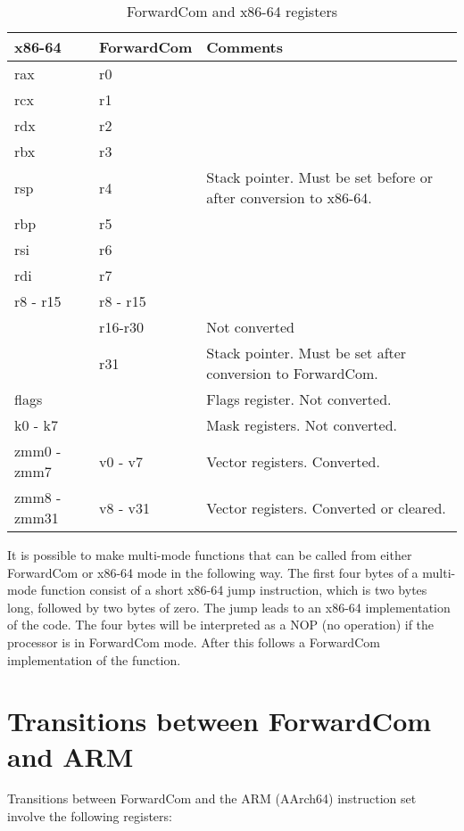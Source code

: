 \documentclass[forwardcom.tex]{subfiles}
\begin{document}
\begin{longtable} {|p{20mm}|p{20mm}|p{80mm}|}
\caption{ForwardCom and x86-64 registers} 
\label{table:ForwardComAndX64Registers}
\\
\endfirsthead
\endhead
\hline
\bfseries x86-64 & \bfseries ForwardCom & \bfseries Comments  \\
\hline
rax & r0 &   \\ 
rcx & r1 &  \\ 
rdx & r2 &  \\ 
rbx & r3 &  \\ 
rsp & r4 & Stack pointer. Must be set before or after conversion to x86-64. \\
rbp & r5 &  \\ 
rsi & r6 &  \\ 
rdi & r7 &  \\ 
r8 - r15 & r8 - r15 &  \\
\hline
 & r16-r30  & Not converted \\
 & r31 & Stack pointer. Must be set after conversion to ForwardCom. \\
\hline
flags &  & Flags register. Not converted. \\
\hline
k0 - k7 &  & Mask registers. Not converted. \\
\hline
zmm0 - zmm7 & v0 - v7 & Vector registers. Converted. \\
zmm8 - zmm31 & v8 - v31 & Vector registers. Converted or cleared. \\
\hline
\end{longtable}

\vspace{2mm}
It is possible to make multi-mode functions that can be called from either ForwardCom or x86-64 mode in the following way. The first four bytes of a multi-mode function consist of a short x86-64 jump instruction, which is two bytes long, followed by two bytes of zero. The jump leads to an x86-64 implementation of the code. The four bytes will be interpreted as a NOP (no operation) if the processor is in ForwardCom mode. After this follows a ForwardCom implementation of the function.


\section{Transitions between ForwardCom and ARM}

Transitions between ForwardCom and the ARM (AArch64) instruction set involve the following registers:
\end{document}
